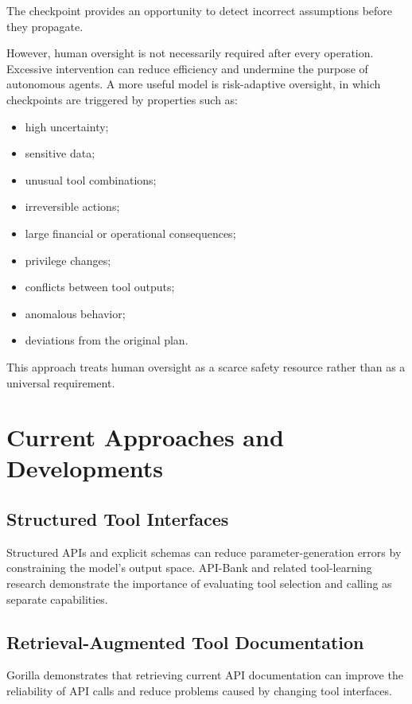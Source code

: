 \documentclass[11pt]{article}
\begin{document}
The checkpoint provides an opportunity to detect incorrect assumptions
before they propagate.

However, human oversight is not necessarily required after
every operation. Excessive intervention can reduce efficiency
and undermine the purpose of autonomous agents. A more
useful model is risk-adaptive oversight, in which
checkpoints are triggered by properties such as:
\begin{itemize}[noitemsep]
    \item high uncertainty;
    \item sensitive data;
    \item unusual tool combinations;
    \item irreversible actions;
    \item large financial or operational consequences;
    \item privilege changes;
    \item conflicts between tool outputs;
    \item anomalous behavior;
    \item deviations from the original plan.
\end{itemize}

This approach treats human oversight as a scarce safety
resource rather than as a universal requirement.

\section{Current Approaches and Developments}

\subsection{Structured Tool Interfaces}

Structured APIs and explicit schemas can reduce
parameter-generation errors by constraining the model's
output space. API-Bank and related tool-learning research
demonstrate the importance of evaluating tool selection and
calling as separate capabilities.

\subsection{Retrieval-Augmented Tool Documentation}

Gorilla demonstrates that retrieving current API
documentation can improve the reliability of API calls and
reduce problems caused by changing tool interfaces.
\end{document}
